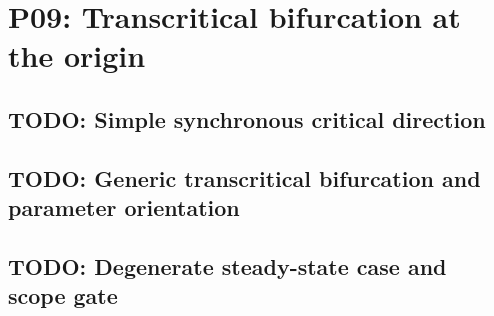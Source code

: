 
\section{P09: Transcritical bifurcation at the origin}
\label{sec:P09}

\subsection{TODO: Simple synchronous critical direction}
\label{slot:P09-1}

\subsection{TODO: Generic transcritical bifurcation and parameter orientation}
\label{slot:P09-2}

\subsection{TODO: Degenerate steady-state case and scope gate}
\label{slot:P09-3}
